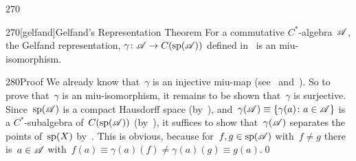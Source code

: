 \begin{parsec}{270}
\begin{point}{270}[gelfand]{Gelfand's Representation Theorem}
For a commutative $C^*$-algebra~$\mathscr{A}$,
the Gelfand representation, 
 $\gamma\colon \mathscr{A}\to C(\mathrm{sp}(\mathscr{A}))$
defined in~
is an miu-isomorphism.
\begin{point}{280}{Proof}%
We already know that~$\gamma$ is an injective miu-map
(see~ 
and~).
So to prove that~$\gamma$ is an miu-isomorphism,
it remains to be shown that~$\gamma$ is surjective.
Since~$\mathrm{sp}(\mathscr{A})$ is a compact Hausdorff space 
(by~),
and~$\gamma(\mathscr{A})\equiv \{\gamma(a)\colon a\in \mathscr{A}\}$
is a $C^*$-subalgebra of~$C(\mathrm{sp}(\mathscr{A}))$
(by~),
it suffices to show that~$\gamma(\mathscr{A})$
separates the points of~$\mathrm{sp}(X)$
by~.
This is obvious,
because
for~$f,g\in \mathrm{sp}(\mathscr{A})$ with~$f\neq g$
there is~$a\in \mathscr{A}$ with~$f(a)\equiv \gamma(a)(f)
\neq \gamma(a)(g)\equiv g(a)$.\qed
\end{point}
\end{point}
\end{parsec}
